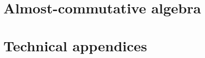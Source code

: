	    
	    
    \part{Almost-commutative algebra}
        
    
        
    
        
	
	\part{Technical appendices}
        \begin{appendices}
            
        
            
            
            
            
            
        \end{appendices}
	
	\printbibliography
	
	\printindex

